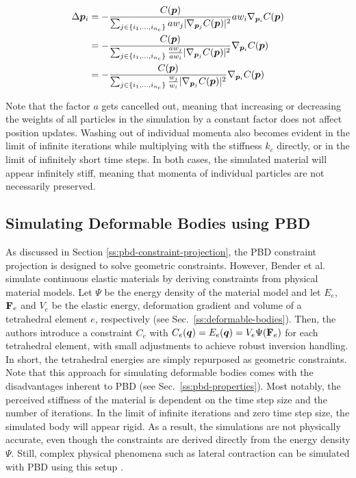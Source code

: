\begin{equation}\label{eq:pbd-masses}
    \begin{split}
        \Delta \bm{p}_i 
        &= -\frac{C(\bm{p})}{\sum_{j \in \{ i_1, \ldots, i_{n_c} \}} aw_j \vert \nabla_{\bm{p}_j}C(\bm{p}) \vert^2 } aw_i \nabla_{\bm{p}_i} C(\bm{p}) \\
        &= -\frac{C(\bm{p})}{\sum_{j \in \{ i_1, \ldots, i_{n_c} \}} \frac{aw_j}{aw_i} \vert \nabla_{\bm{p}_j}C(\bm{p}) \vert^2 } \nabla_{\bm{p}_i} C(\bm{p}) \\
        &= -\frac{C(\bm{p})}{\sum_{j \in \{ i_1, \ldots, i_{n_c} \}} \frac{w_j}{w_i} \vert \nabla_{\bm{p}_j}C(\bm{p}) \vert^2 } \nabla_{\bm{p}_i} C(\bm{p})
    \end{split}
\end{equation}

\noindent Note that the factor $a$ gets cancelled out, meaning that increasing or decreasing the weights of all particles in the simulation by a constant
factor does not affect position updates. Washing out of individual momenta also becomes evident in the limit of infinite iterations while multiplying 
with the stiffness $k_c$ directly, or in the limit of infinitely short time steps. In both cases, the simulated material will appear infinitely stiff, 
meaning that momenta of individual particles are not necessarily preserved.

\subsection{Simulating Deformable Bodies using PBD}\label{ss:pbd-deformable-bodies}
As discussed in Section \ref{ss:pbd-constraint-projection}, the PBD constraint projection is designed to solve geometric constraints. However, Bender et al.\ 
\cite{bender2014} simulate continuous elastic materials by deriving constraints from physical material models. Let $\Psi$ be the energy density of the 
material model and let $E_e$, $\mathbf{F}_e$ and $V_e$ be the elastic energy, deformation gradient and volume of a tetrahedral element $e$, respectively
(see Sec.\ \ref{ss:deformable-bodies}). Then, the authors introduce a constraint $C_e$ with $C_e(\bm{q}) = E_e(\bm{q}) = V_e\Psi(\mathbf{F}_e)$ for each 
tetrahedral element, with small adjustments to achieve robust inversion handling. In short, the tetrahedral energies are simply repurposed as geometric 
constraints. Note that this approach for simulating 
deformable bodies comes with the disadvantages inherent to PBD (see Sec.\ \ref{ss:pbd-properties}). Most notably, the perceived stiffness of the material is 
dependent on the time step size and the number of iterations. In the limit of infinite iterations and zero time step size, the simulated body will 
appear rigid. As a result, the simulations are not physically accurate, even though the constraints are derived directly from the energy density $\Psi$. 
Still, complex physical phenomena such as lateral contraction can be simulated with PBD using this setup \cite{bender2014}.

